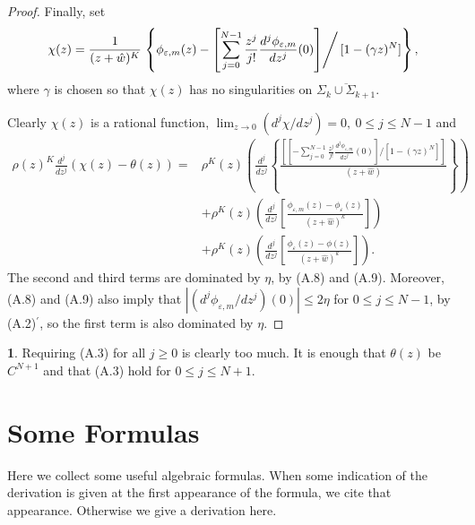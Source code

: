 \documentclass{surv-l}
\theoremstyle{plain}
\theoremstyle{definition}
\newtheorem{remark}[theorem]{\sc{Remark}}
\numberwithin{equation}{chapter}
\begin{document}
{\begin{proof}
Finally, set
\begin{equation*}
\chi(z)=\frac{1}{(z+\hat{w})^{K}}\left.\left\{\phi_{\varepsilon,m}(z)- \left[\sum_{j=0}^{N-1}\frac{z^{j}}{j!} \frac{d^{j}\phi_{\varepsilon,m}}{dz^{j}}(0)\right]\right/[1-(\gamma z)^{N}]\right\},
\end{equation*}
where $\gamma$ is chosen so that $\chi(z)$ has no singularities on $\overline{\Sigma_{k}\cup\Sigma_{k+1}}$.

Clearly $\chi(z)$ is a rational function, $\lim_{z\rightarrow 0}(d^{j}\chi/dz^{j})=0,\ 0\leq j\leq N-1$ and
\begin{align*}
\rho(z)^{K}\frac{d^{j}}{dz^{j}}(\chi(z)-\theta(z))= & \rho^{K}(z)\left(\frac{d^{j}}{dz^{j}} \left\{\frac{[[-\sum_{j=0}^{N-1}\frac{z^{j}}{j!}\frac{d^{j}\phi_{\varepsilon, m}}{dz^{j}}(0)]/[1-(\gamma z)^{N}]]}{(z+\hat{w})}\right\}\right)\\
& +\rho^{K}(z) \left(\frac{d^{j}}{dz^{j}} \left[\frac{\phi_{\varepsilon,m}(z)-\phi_{\varepsilon}(z)}{(z+\hat{w})^{k}}\right]\right)\\
& +\rho^{K}(z)\left(\frac{d^{j}}{dz^{j}}\left[\frac{\phi_{\varepsilon}(z)-\phi(z)}{(z+\hat{w})^{k}}\right]\right).
\end{align*}
The second and third terms are dominated by $\eta$, by (A.8) and (A.9). Moreover, (A.8) and (A.9) also imply that $|(d^{j}\phi_{\varepsilon,m}/dz^{j})(0)|\leq 2\eta$ for $0\leq j\leq N-1$, by (A.2)$^{\prime}$, so the first term is also dominated by $\eta$.
\end{proof}
\setcounter{theorem}{9}
\begin{remark}\label{remA.10}
Requiring (A.3) for all $j\geq 0$ is clearly too much. It is enough that $\theta(z)$ be $C^{N+1}$ and that (A.3) hold for $0\leq j\leq N+1$.
\end{remark}

\chapter{Some Formulas}\label{appB}

Here we collect some useful algebraic formulas. When some indication of the derivation is given at the first appearance of the formula, we cite that appearance. Otherwise we give a derivation here.

}
\end{document}
